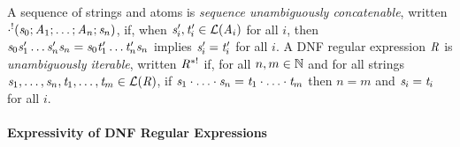 \documentclass[numbers,10pt,preprint\ifanon ,nocopyrightspace\fi]{sigplanconf}
\begin{document}
A sequence of strings and atoms is \textit{sequence unambiguously
  concatenable},
written $\cdot^!(\mathit{s}_0;\mathit{A}_1;\ldots;\mathit{A}_n;\mathit{s}_n)$,
if, when $\mathit{s}_i',\mathit{t}_i'\in\mathcal{L}(\mathit{A}_i)$ for all $i$, then
$\mathit{s}_0\mathit{s}_1'\ldots\mathit{s}_n'\mathit{s}_n=
\mathit{s}_0\mathit{t}_1'\ldots\mathit{t}_n'\mathit{s}_n$
implies $\mathit{s}_i'=\mathit{t}_i'$ for all $i$.
%
A DNF regular expression $\mathit{R}$ is \textit{unambiguously iterable},
written $\mathit{R}^{*!}$ if,
for all $n,m\in\mathbb{N}$ and for all strings
$\mathit{s}_1,\ldots,\mathit{s}_n,\mathit{t}_1,\ldots,\mathit{t}_m\in\mathcal{L}(\mathit{R})$,
if
$\mathit{s}_1\cdot\ldots\cdot\mathit{s}_n=\mathit{t}_1\cdot\ldots\cdot\mathit{t}_m$
then $n=m$ and $\mathit{s}_i=\mathit{t}_i$ for all $i$.

\paragraph*{Expressivity of DNF Regular Expressions}
\end{document}

